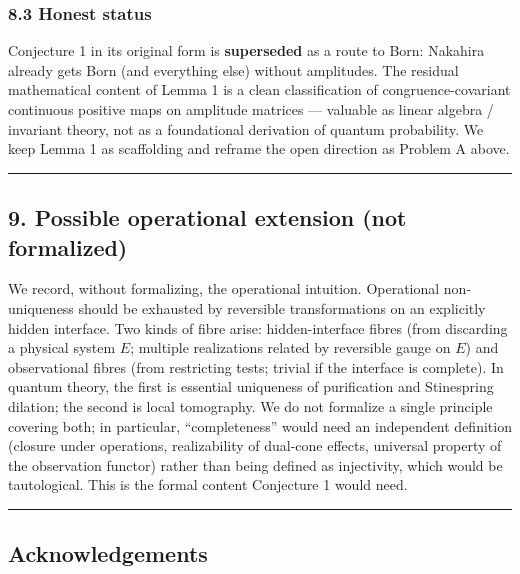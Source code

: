 \documentclass[
]{article}
\begin{document}
\subsubsection{8.3 Honest status}\label{honest-status}

Conjecture 1 in its original form is \textbf{superseded} as a route to
Born: Nakahira already gets Born (and everything else) without
amplitudes. The residual mathematical content of Lemma 1 is a clean
classification of congruence-covariant continuous positive maps on
amplitude matrices --- valuable as linear algebra / invariant theory,
not as a foundational derivation of quantum probability. We keep Lemma 1
as scaffolding and reframe the open direction as Problem A above.

\begin{center}\rule{0.5\linewidth}{0.5pt}\end{center}

\subsection{9. Possible operational extension (not
formalized)}\label{possible-operational-extension-not-formalized}

We record, without formalizing, the operational intuition. Operational
non-uniqueness should be exhausted by reversible transformations on an
explicitly hidden interface. Two kinds of fibre arise: hidden-interface
fibres (from discarding a physical system \(E\); multiple realizations
related by reversible gauge on \(E\)) and observational fibres (from
restricting tests; trivial if the interface is complete). In quantum
theory, the first is essential uniqueness of purification and
Stinespring dilation; the second is local tomography. We do not
formalize a single principle covering both; in particular,
``completeness'' would need an independent definition (closure under
operations, realizability of dual-cone effects, universal property of
the observation functor) rather than being defined as injectivity, which
would be tautological. This is the formal content Conjecture 1 would
need.

\begin{center}\rule{0.5\linewidth}{0.5pt}\end{center}

\subsection{Acknowledgements}\label{acknowledgements}
\end{document}
